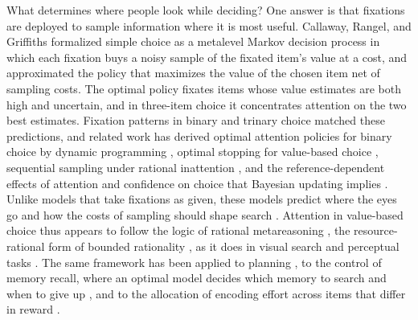 \documentclass[10pt,letterpaper]{article}
\begin{document}
What determines where people look while deciding? One answer is that
fixations are deployed to sample information where it is most useful.
Callaway, Rangel, and Griffiths \cite{callaway2021} formalized simple
choice as a metalevel Markov decision process in which each fixation
buys a noisy sample of the fixated item's value at a cost, and
approximated the policy that maximizes the value of the chosen item net
of sampling costs. The optimal policy fixates items whose value
estimates are both high and uncertain, and in three-item choice it
concentrates attention on the two best estimates. Fixation patterns in
binary and trinary choice matched these predictions, and related work
has derived optimal attention policies for binary choice by dynamic
programming \cite{jang2021}, optimal stopping for value-based choice
\cite{tajima2016,tajima2019,fudenberg2018}, sequential sampling under
rational inattention \cite{hebert2023}, and the reference-dependent
effects of attention and confidence on choice that Bayesian updating
implies \cite{fromer2025}. Unlike models that take fixations as given,
these models predict where the eyes go and how the costs of sampling
should shape search \cite{ting2024}. Attention in value-based choice
thus appears to follow the logic of rational metareasoning
\cite{russell1991,hay2012,lieder2020,lieder2026}, the resource-rational
form of bounded rationality
\cite{simon1955,russell1995,lewis2014,griffiths2015,gershman2015}, as it
does in visual search and perceptual tasks
\cite{najemnik2005,yang2016,gottlieb2012,hoppe2016}. The same framework
has been applied to planning \cite{callaway2022}, to the control of
memory recall, where an optimal model decides which memory to search and
when to give up \cite{callaway2024}, and to the allocation of encoding
effort across items that differ in reward \cite{ma2026}.
\end{document}
